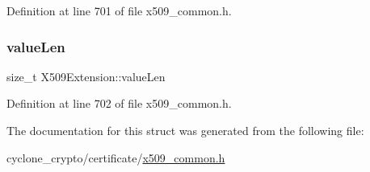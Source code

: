 Definition at line 701 of file x509\+\_\+common.\+h.

\mbox{\label{structX509Extension_a0755db4dfc17cf65b84bb318852db166}} 
\subsubsection{\texorpdfstring{value\+Len}{valueLen}}
{\footnotesize\ttfamily size\+\_\+t X509\+Extension\+::value\+Len}



Definition at line 702 of file x509\+\_\+common.\+h.



The documentation for this struct was generated from the following file\+:\begin{DoxyCompactItemize}
\item 
cyclone\+\_\+crypto/certificate/\hyperlink{certificate_2x509__common_8h}{x509\+\_\+common.\+h}\end{DoxyCompactItemize}
